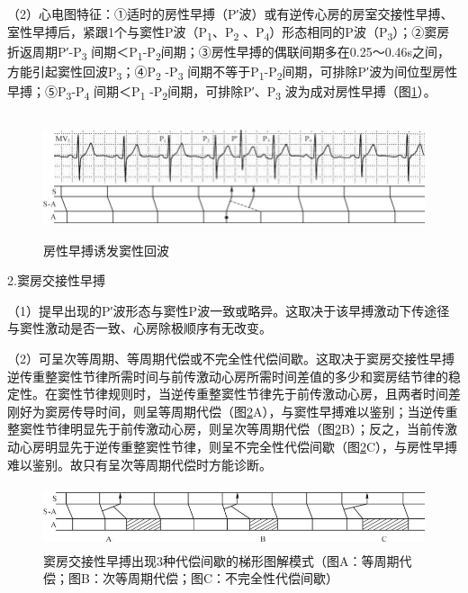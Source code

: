 （2）心电图特征：①适时的房性早搏（P′波）或有逆传心房的房室交接性早搏、室性早搏后，紧跟1个与窦性P波（P\textsubscript{1}、P\textsubscript{2} 、P\textsubscript{4}）形态相同的P波（P\textsubscript{3}）；②窦房折返周期P′-P\textsubscript{3} 间期＜P\textsubscript{1}-P\textsubscript{2}间期；③房性早搏的偶联间期多在0.25～0.46s之间，方能引起窦性回波P\textsubscript{3}；④P\textsubscript{2} -P\textsubscript{3} 间期不等于P\textsubscript{1}-P\textsubscript{2}间期，可排除P′波为间位型房性早搏；⑤P\textsubscript{3}-P\textsubscript{4} 间期＜P\textsubscript{1} -P\textsubscript{2}间期，可排除P′、P\textsubscript{3} 波为成对房性早搏（图\ref{fig1-19}）。

\begin{figure}[!htbp]
 \centering
 \includegraphics[width=5.73958in,height=1.41667in]{./images/Image00025.jpg}
 \captionsetup{justification=centering}
 \caption{房性早搏诱发窦性回波}
 \label{fig1-19}
  \end{figure} 

2.窦房交接性早搏

（1）提早出现的P′波形态与窦性P波一致或略异。这取决于该早搏激动下传途径与窦性激动是否一致、心房除极顺序有无改变。

（2）可呈次等周期、等周期代偿或不完全性代偿间歇。这取决于窦房交接性早搏逆传重整窦性节律所需时间与前传激动心房所需时间差值的多少和窦房结节律的稳定性。在窦性节律规则时，当逆传重整窦性节律先于前传激动心房，且两者时间差刚好为窦房传导时间，则呈等周期代偿（图\ref{fig1-20}A），与窦性早搏难以鉴别；当逆传重整窦性节律明显先于前传激动心房，则呈次等周期代偿（图\ref{fig1-20}B）；反之，当前传激动心房明显先于逆传重整窦性节律，则呈不完全性代偿间歇（图\ref{fig1-20}C），与房性早搏难以鉴别。故只有呈次等周期代偿时方能诊断。

\begin{figure}[!htbp]
 \centering
 \includegraphics[width=5.5625in,height=0.71875in]{./images/Image00026.jpg}
 \captionsetup{justification=centering}
 \caption{窦房交接性早搏出现3种代偿间歇的梯形图解模式（图A：等周期代偿；图B：次等周期代偿；图C：不完全性代偿间歇）}
 \label{fig1-20}
  \end{figure} 

